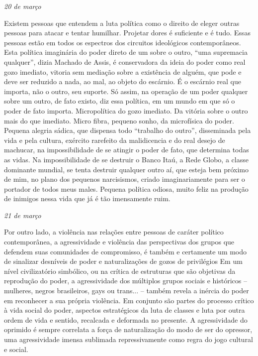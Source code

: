 \begin{flushright}
\emph{20 de março}
\end{flushright}

Existem pessoas que entendem a luta política como o direito de eleger
outras pessoas para atacar e tentar humilhar. Projetar dores é
suficiente e é tudo. Essas pessoas estão em todos os espectros dos
circuitos ideológicos contemporâneos. Esta política imaginária do poder
direto de um sobre o outro, ``uma supremacia qualquer'', dizia Machado
de Assis, é conservadora da ideia do poder como real gozo imediato,
vitoria sem mediação sobre a existência de alguém, que pode e deve ser
reduzido a nada, ao mal, ao objeto do escárnio. É o escárnio real que
importa, não o outro, seu suporte. Só assim, na operação de um poder
qualquer sobre um outro, de fato existo, diz essa política, em um mundo
em que só o poder de fato importa. Micropolítica do gozo imediato. Da
vitória sobre o outro mais do que imediato. Micro fibra, pequeno sonho,
da microfísica do poder. Pequena alegria sádica, que dispensa todo
``trabalho do outro'', disseminada pela vida e pela cultura, exército
rarefeito da malidicencia e do real desejo de machucar, na
impossibilidade de se atingir o poder de fato, que determina todas as
vidas. Na impossibilidade de se destruir o Banco Itaú, a Rede Globo, a
classe dominante mundial, se tenta destruir qualquer outro aí, que
esteja bem próximo de mim, no plano dos pequenos narcisismos, criado
imaginariamente para ser o portador de todos meus males. Pequena
política odiosa, muito feliz na produção de inimigos nessa vida que já é
tão imensamente ruim.

\begin{flushright}
\emph{21 de março}
\end{flushright}

Por outro lado, a violência nas relações entre pessoas de caráter
político contemporânea, a agressividade e violência das perspectivas dos
grupos que defendem suas comunidades de compromisso, é também e
certamente um modo de sinalizar desníveis de poder e naturalizações de
gozos de privilégios Em um nível civilizatório simbólico, ou na crítica
de estruturas que são objetivas da reprodução do poder, a agressividade
dos múltiplos grupos sociais e históricos -- mulheres, negros
brasileiros, gays ou trans... -- também revela a inércia do poder em
reconhecer a sua própria violência. Em conjunto são partes do processo
crítico à vida social do poder, aspectos estratégicos da luta de classes
e luta por outra ordem de vida e sentido, recalcada e deformada no
presente. A agressividade do oprimido é sempre correlata a força de
naturalização do modo de ser do opressor, uma agressividade imensa
sublimada repressivamente como regra do jogo cultural e social.

